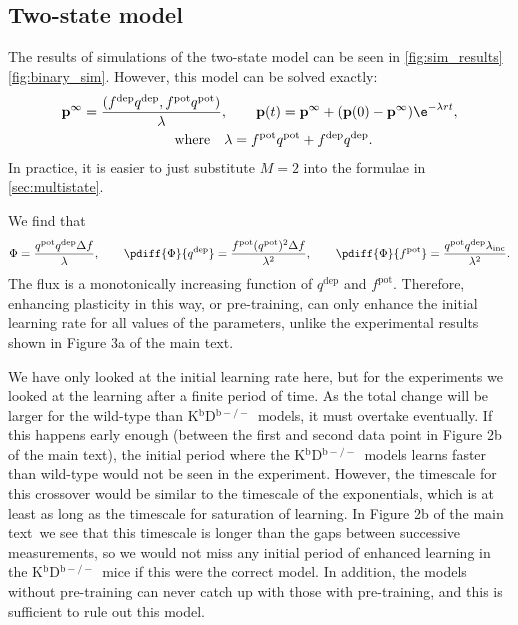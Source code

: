\documentclass[10pt]{article}
\newcommand{\pr}{\mathbf{p}}
\newcommand{\eq}{\pr^\infty}
\newcommand{\pot}{^{\text{pot}}}
\newcommand{\dep}{^{\text{dep}}}
\newcommand{\inc}{_{\text{inc}}}
\newcommand{\KO}{K$^\mathrm{b}$D$^{\mathrm{b}-/-}$}
\newcommand{\modelfig}[1][a]{Figure 3#1 of the main text}
\newcommand{\datafig}[1][b]{Figure 2#1 of the main text}
\begin{document}



\subsection{Two-state model}\label{sec:binary}




The results of simulations of the two-state model can be seen in
\autoref{fig:sim_results}\ref{fig:binary_sim}.
However, this model can be solved exactly:
%
\begin{multline}\label{eq:binarysol}
  \eq = \frac{(f\dep q\dep, f\pot q\pot)}{\lambda},
  \qquad
  \pr(t) = \eq + (\pr(0)-\eq)\e^{-\lambda rt},\\
  \qquad \text{where} \quad
  \lambda = f\pot q\pot + f\dep q\dep.
\end{multline}
%
In practice, it is easier to just substitute $M=2$ into the formulae in \autoref{sec:multistate}.

We find that
%
\begin{equation}\label{eq:binaryflux}
  \Phi = \frac{q\pot q\dep \Delta f}{\lambda}, \qquad
  \pdiff{\Phi}{q\dep} = \frac{f\pot (q\pot)^2 \Delta f}{\lambda^2}, \qquad
  \pdiff{\Phi}{f\pot} = \frac{q\pot q\dep \lambda\inc}{\lambda^2}.
\end{equation}
%
The flux is a monotonically increasing function of $q\dep$ and $f\pot$.
Therefore, enhancing plasticity in this way, or pre-training, can only enhance the initial learning rate for all values of the parameters, unlike the experimental results shown in \modelfig.



We have only looked at the initial learning rate here, but for the experiments we looked at the learning after a finite period of time.
As the total change will be larger for the wild-type than \KO\ models, it must overtake eventually.
If this happens early enough (\ie between the first and second data point in \datafig), the initial period where the \KO\ models learns faster than wild-type would not be seen in the experiment.
However, the timescale for this crossover would be similar to the timescale of the exponentials, which is at least as long as the timescale for saturation of learning.
In \datafig\ we see that this timescale is longer than the gaps between successive measurements, so we would not miss any initial period of enhanced learning in the \KO\ mice if this were the correct model.
In addition, the models without pre-training can never catch up with those with pre-training, and this is sufficient to rule out this model.
\end{document}
